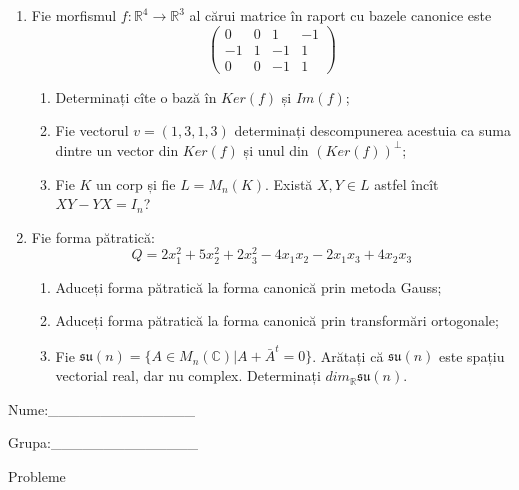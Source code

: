 \documentclass{article}
\begin{document}
\begin{enumerate}
 \item Fie morfismul $f:\mathbb{R}^4 \to \mathbb{R}^3$ al cărui matrice în raport cu bazele canonice este
$$\begin{pmatrix}
0&0&1&-1\\
-1&1&-1&1\\
0&0&-1&1
\end{pmatrix}$$

\begin{enumerate}
\item Determinați cîte o bază în $Ker(f)$ și $Im(f)$;
\item Fie vectorul $v=(1,3,1,3)$ determinați descompunerea acestuia ca suma dintre un vector din $Ker(f)$ și unul din $(Ker(f))^\perp$;
\item Fie $K$ un corp și fie $L=M_n(K)$. Există $X,Y \in L$ astfel încît $XY-YX=I_n$?  
\end{enumerate}
\item Fie forma pătratică:
$$Q= 2x_1^2+5x_2^2+2x_3^2-4x_1x_2-2x_1x_3+4x_2x_3$$

\begin{enumerate}
\item Aduceți forma pătratică la forma canonică prin metoda Gauss;
\item Aduceți forma pătratică la forma canonică prin transformări ortogonale;
\item Fie $\mathfrak{su}(n)=\{ A \in M_n(\mathbb{C}) | A+\bar{A}^t=0\}$. Arătați că $\mathfrak{su}(n)$ este spațiu vectorial real, dar nu complex.
Determinați $dim_{\mathbb{R}}\mathfrak{su}(n)$.
\end{enumerate}
\end{enumerate}
\newpage
\begin{flushright}
Nume:\_\_\_\_\_\_\_\_\_\_\_\_\_\_
 
 
Grupa:\_\_\_\_\_\_\_\_\_\_\_\_\_\_
\end{flushright}
\begin{center}
\vspace{2cm}
{\Large Probleme}
\vspace{2cm}
\end{center}
\end{document}
